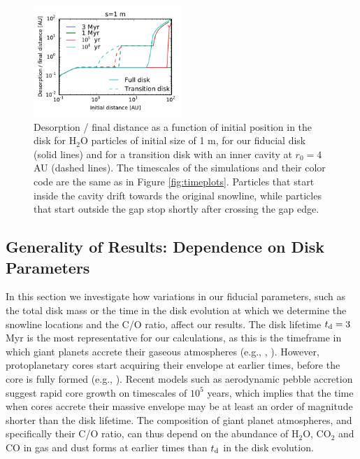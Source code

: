 \documentclass[apj]{emulateapj}
\begin{document}
\begin{figure}[h!]
\centering
\includegraphics[width=0.5\textwidth]{../../figs/desorption_distance_transition_disk_1000.pdf}
\caption{Desorption / final distance as a function of initial position in the disk for H$_2$O particles of initial size of 1 m, for our fiducial disk (solid lines) and for a transition disk with an inner cavity at $r_0=4$ AU (dashed lines). The timescales of the simulations and their color code are the same as in Figure \ref{fig:timeplots}. Particles that start inside the cavity drift towards the original snowline, while particles that start outside the gap stop shortly after crossing the gap edge.}
\label{fig:cavity}
\end{figure}


\subsection{Generality of Results: Dependence on Disk Parameters}
\label{sec:incond}

In this section we investigate how variations in our fiducial parameters, such as the total disk mass or the time in the disk evolution at which we determine the snowline locations and the C/O ratio, affect our results. The disk lifetime $t_{\rm d}=3$ Myr is the most representative for our calculations, as this is the timeframe in which giant planets accrete their gaseous atmospheres (e.g., \citealt{pollack96}, \citealt{piso14}). However, protoplanetary cores start acquiring their envelope at earlier times, before the core is fully formed (e.g., \citealt{rafikov06}). Recent models such as aerodynamic pebble accretion \citep{lambrechts12} suggest rapid core growth on timescales of $10^5$ years, which implies that the time when cores accrete their massive envelope may be at least an order of magnitude shorter than the disk lifetime. The composition of giant planet atmospheres, and specifically their C/O ratio, can thus depend on the abundance of H$_2$O, CO$_2$ and CO in gas and dust forms at earlier times than $t_{\rm d}$ in the disk evolution. 
\end{document}

